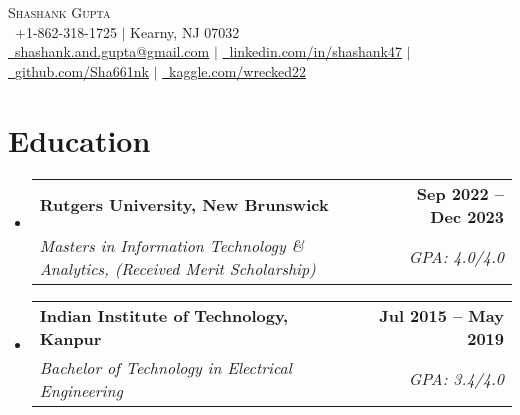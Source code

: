 \documentclass[letterpaper,11pt]{article}
\makeatletter
\newcommand{\resumeSubheading}[4]{
  \vspace{-2pt}\item
    \begin{tabular*}{1.0\textwidth}[t]{l@{\extracolsep{\fill}}r}
      \textbf{\fontsize{11}{10}\selectfont #1} & \textbf{\small #2} \\
      \textit{\small#3} & \textit{\small #4} \\
    \end{tabular*}\vspace{-5pt}
}
\newcommand{\resumeSubHeadingListStart}{\begin{itemize}[leftmargin=0.0in, label={}]}
\newcommand{\resumeSubHeadingListEnd}{\end{itemize}}
\makeatother
\begin{document}



\begin{center}
    {\huge \scshape Shashank Gupta} \\ \vspace{1pt}
    \small \raisebox{-0.1\height}\faPhone\ +1-862-318-1725 $|$ Kearny, NJ 07032 \\ \vspace{1pt}
     \href{mailto:shashank.and.gupta@gmail.com}{\raisebox{-0.2\height}\faEnvelope\
     {\color{blue}\underline{shashank.and.gupta@gmail.com}}} $|$ 
    \href{https://www.linkedin.com/in/shashank47/}{\raisebox{-0.2\height}\faLinkedin\ {\color{blue}\underline{linkedin.com/in/shashank47}}} $|$
    \href{https://github.com/Sha661nk}{\raisebox{-0.2\height}\faGithub\ {\color{blue}\underline{github.com/Sha661nk}}} $|$ \href{https://www.kaggle.com/wrecked22}{\raisebox{-0.1\height}\faKaggle\ {\color{blue}\underline{kaggle.com/wrecked22}}}
    \vspace{-8pt}
\end{center}


\section{Education}
  \resumeSubHeadingListStart
    \resumeSubheading
      {Rutgers University, New Brunswick}{Sep 2022 -- Dec 2023}
      {Masters in Information Technology \& Analytics, (Received Merit Scholarship)}{GPA: 4.0/4.0}

\vspace{-4pt}

    \resumeSubheading
      {Indian Institute of Technology, Kanpur}{Jul 2015 -- May 2019}
      {Bachelor of Technology in Electrical Engineering}{GPA: 3.4/4.0}
  \resumeSubHeadingListEnd

 \vspace{-12pt}
\end{document}
